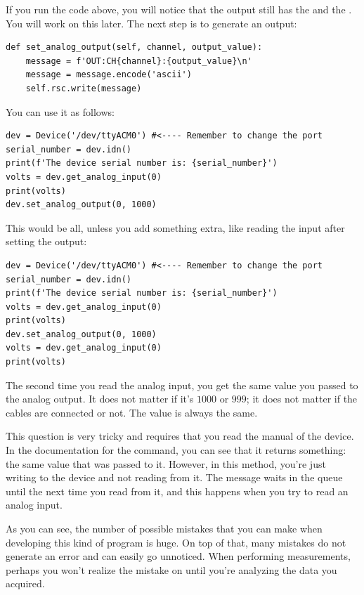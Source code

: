 If you run the code above, you will notice that the output still has the  and the \py{\n}. You will work on this later. The next step is to generate an output:

\begin{verbatim}
def set_analog_output(self, channel, output_value):
    message = f'OUT:CH{channel}:{output_value}\n'
    message = message.encode('ascii')
    self.rsc.write(message)
\end{verbatim}

You can use it as follows:

\begin{verbatim}
dev = Device('/dev/ttyACM0') #<---- Remember to change the port
serial_number = dev.idn()
print(f'The device serial number is: {serial_number}')
volts = dev.get_analog_input(0)
print(volts)
dev.set_analog_output(0, 1000)
\end{verbatim}

This would be all, unless you add something extra, like reading the input after setting the output:

\begin{verbatim}
dev = Device('/dev/ttyACM0') #<---- Remember to change the port
serial_number = dev.idn()
print(f'The device serial number is: {serial_number}')
volts = dev.get_analog_input(0)
print(volts)
dev.set_analog_output(0, 1000)
volts = dev.get_analog_input(0)
print(volts)
\end{verbatim}

The second time you read the analog input, you get the same value you passed to the analog output. It does not matter if it's $1000$ or $999$; it does not matter if the cables are connected or not. The value is always the same.


This question is very tricky and requires that you read the manual of the device. In the documentation for the  command, you can see that it returns something: the same value that was passed to it. However, in this method, you're just writing to the device and not reading from it. The message waits in the queue until the next time you read from it, and this happens when you try to read an analog input.

As you can see, the number of possible mistakes that you can make when developing this kind of program is huge. On top of that, many mistakes do not generate an error and can easily go unnoticed. When performing measurements, perhaps you won't realize the mistake on  until you're analyzing the data you acquired.

